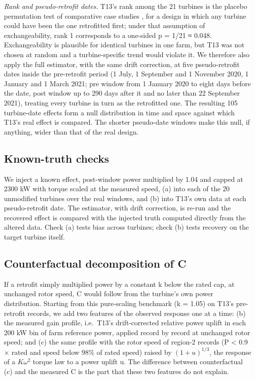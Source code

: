 \documentclass[preprint,12pt]{elsarticle}
\begin{document}
\emph{Rank and pseudo-retrofit dates.} T13's rank among the 21 turbines is the placebo permutation test of comparative case studies \cite{abadie10}, for a design in which any turbine could have been the one retrofitted first; under that assumption of exchangeability, rank 1 corresponds to a one-sided p = 1/21 ≈ 0.048. Exchangeability is plausible for identical turbines in one farm, but T13 was not chosen at random and a turbine-specific trend would violate it. We therefore also apply the full estimator, with the same drift correction, at five pseudo-retrofit dates inside the pre-retrofit period (1 July, 1 September and 1 November 2020, 1 January and 1 March 2021; pre window from 1 January 2020 to eight days before the date, post window up to 290 days after it and no later than 22 September 2021), treating every turbine in turn as the retrofitted one. The resulting 105 turbine-date effects form a null distribution in time and space against which T13's real effect is compared. The shorter pseudo-date windows make this null, if anything, wider than that of the real design.

\subsection{Known-truth checks}

We inject a known effect, post-window power multiplied by 1.04 and capped at 2300 kW with torque scaled at the measured speed, (a) into each of the 20 unmodified turbines over the real windows, and (b) into T13's own data at each pseudo-retrofit date. The estimator, with drift correction, is re-run and the recovered effect is compared with the injected truth computed directly from the altered data. Check (a) tests bias across turbines; check (b) tests recovery on the target turbine itself.

\subsection{Counterfactual decomposition of C}

If a retrofit simply multiplied power by a constant k below the rated cap, at unchanged rotor speed, C would follow from the turbine's own power distribution. Starting from this pure-scaling benchmark (k = 1.05) on T13's pre-retrofit records, we add two features of the observed response one at a time: (b) the measured gain profile, i.e.~T13's drift-corrected relative power uplift in each 200 kW bin of farm reference power, applied record by record at unchanged rotor speed; and (c) the same profile with the rotor speed of region-2 records (P \textless{} 0.9 × rated and speed below 98\% of rated speed) raised by \((1+u)^{1/3}\), the response of a \(K\omega^2\) torque law to a power uplift u. The difference between counterfactual (c) and the measured C is the part that these two features do not explain.
\end{document}
